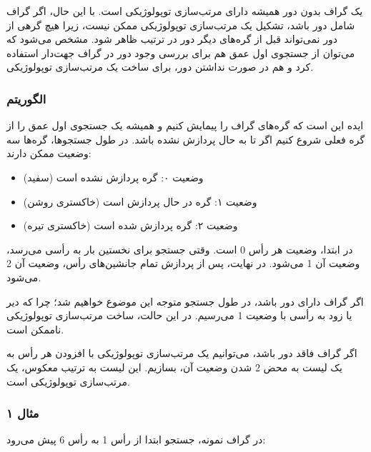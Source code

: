 یک گراف بدون دور همیشه دارای مرتب‌سازی توپولوژیکی است.
با این حال، اگر گراف شامل دور باشد،
تشکیل یک مرتب‌سازی توپولوژیکی ممکن نیست،
زیرا هیچ گرهی از دور نمی‌تواند
قبل از گره‌های دیگر دور در ترتیب ظاهر شود.
مشخص می‌شود که می‌توان از جستجوی اول عمق هم برای
بررسی وجود دور در گراف جهت‌دار استفاده کرد
و هم در صورت نداشتن دور، برای ساخت یک مرتب‌سازی توپولوژیکی.

\subsubsection{الگوریتم}

ایده این است که گره‌های گراف را پیمایش کنیم
و همیشه یک جستجوی اول عمق را از گره فعلی شروع کنیم
اگر تا به حال پردازش نشده باشد.
در طول جستجوها، گره‌ها سه وضعیت ممکن دارند:

\begin{itemize}
\item وضعیت ۰: گره پردازش نشده است (سفید)
\item وضعیت ۱: گره در حال پردازش است (خاکستری روشن)
\item وضعیت ۲: گره پردازش شده است (خاکستری تیره)
\end{itemize}

در ابتدا، وضعیت هر رأس 0 است.
وقتی جستجو برای نخستین بار به رأسی می‌رسد،
وضعیت آن 1 می‌شود.
در نهایت، پس از پردازش تمام جانشین‌های رأس،
وضعیت آن 2 می‌شود.

اگر گراف دارای دور باشد، در طول جستجو
متوجه این موضوع خواهیم شد؛ چرا که دیر یا زود
به رأسی با وضعیت 1 می‌رسیم.
در این حالت، ساخت مرتب‌سازی توپولوژیکی ناممکن است.

اگر گراف فاقد دور باشد، می‌توانیم یک مرتب‌سازی
توپولوژیکی با افزودن هر رأس به یک لیست
به محض 2 شدن وضعیت آن، بسازیم.
این لیست به ترتیب معکوس، یک مرتب‌سازی توپولوژیکی است.

\subsubsection{مثال ۱}

در گراف نمونه، جستجو ابتدا از رأس 1
به رأس 6 پیش می‌رود:

\begin{center}
\end{center}

